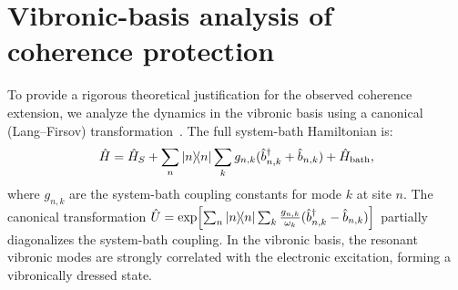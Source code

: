 \documentclass[11pt,a4paper]{article}
\begin{document}



\section{Vibronic-basis analysis of coherence protection}
\label{sec:S7}

To provide a rigorous theoretical justification for the observed coherence extension, we analyze the dynamics in the vibronic basis using a canonical (Lang--Firsov) transformation~\cite{Huelga2013,Chin2011}. The full system-bath Hamiltonian is:
\begin{equation}
\hat{H} = \hat{H}_S + \sum_n \dyad{n} \sum_k g_{n,k}(\hat{b}_{n,k}^\dagger + \hat{b}_{n,k}) + \hat{H}_{\mathrm{bath}},
\label{eq:SI_full_hamiltonian}
\end{equation}
where $g_{n,k}$ are the system-bath coupling constants for mode $k$ at site $n$. The canonical transformation $\hat{U} = \exp\!\left[\sum_n \dyad{n} \sum_k \frac{g_{n,k}}{\omega_k}(\hat{b}_{n,k}^\dagger - \hat{b}_{n,k})\right]$ partially diagonalizes the system-bath coupling. In the vibronic basis, the resonant vibronic modes are strongly correlated with the electronic excitation, forming a vibronically dressed state.
\end{document}
